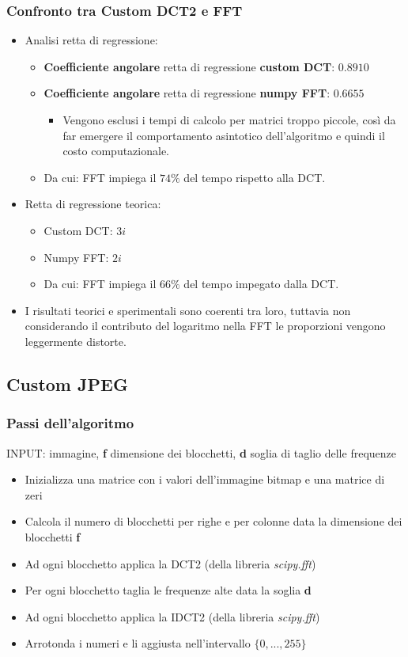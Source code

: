 \documentclass{beamer}
\begin{document}
\begin{frame}
	\frametitle{Confronto tra Custom DCT2 e FFT}
	\begin{itemize}
		\item Analisi retta di regressione:
		\begin{itemize}
					\item \textbf{Coefficiente angolare }retta di regressione \textbf{custom DCT}: $0.8910$
					\item \textbf{Coefficiente angolare }retta di regressione \textbf{numpy FFT}: $0.6655$
					\begin{itemize}
						\item Vengono esclusi i tempi di calcolo per matrici troppo piccole, così da far emergere il comportamento asintotico dell'algoritmo e quindi il costo computazionale.
					\end{itemize}
					\item Da cui: FFT impiega il $74\%$ del tempo rispetto alla DCT.
		\end{itemize}
	\item Retta di regressione teorica:
	\begin{itemize}
		\item Custom DCT: $3i$
		\item Numpy FFT: $2i$
		\item Da cui: FFT impiega il $66\%$ del tempo impegato dalla DCT.
	\end{itemize}
	\item I risultati teorici e sperimentali sono coerenti tra loro, tuttavia non considerando il contributo del logaritmo nella FFT le proporzioni vengono leggermente distorte.
	\end{itemize}
	
\end{frame}

\subsection{Custom JPEG}

\begin{frame}
\frametitle{Passi dell'algoritmo}
\begin{small}
INPUT: immagine, \textbf{f} dimensione dei blocchetti, \textbf{d} soglia di taglio delle frequenze
\begin{itemize}
\item Inizializza una matrice con i valori dell'immagine bitmap e una matrice di zeri
\item Calcola il numero di blocchetti per righe e per colonne data la dimensione dei blocchetti \textbf{f}
\item Ad ogni blocchetto applica la DCT2 (della libreria \textit{scipy.fft})
\item Per ogni blocchetto taglia le frequenze alte data la soglia \textbf{d}
\item Ad ogni blocchetto applica la IDCT2 (della libreria \textit{scipy.fft})
\item Arrotonda i numeri e li aggiusta nell'intervallo $\{0,...,255\}$
\end{itemize}
\end{small}
\end{frame}
\end{document}
